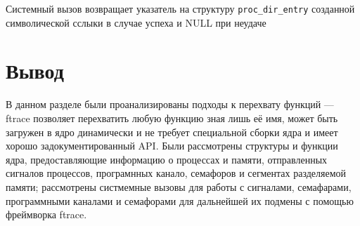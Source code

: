 Системный вызов возвращает указатель на структуру \texttt{proc\_dir\_entry} созданной символической сслыки в случае успеха и NULL при неудаче

\section*{Вывод}

В данном разделе были проанализированы подходы к перехвату функций --- ftrace позволяет перехватить любую функцию зная лишь её имя, может быть загружен в ядро динамически и не требует специальной сборки ядра и имеет хорошо задокументированный API. Были рассмотрены структуры и функции ядра, предоставляющие информацию о процессах и памяти, отправленных сигналов процессов, програмнных канало, семафоров и сегментах разделяемой памяти; рассмотрены систмемные вызовы для работы с сигналами, семафарами, программными каналами и семафорами для дальнейшей их подмены с помощью фреймворка ftrace.
